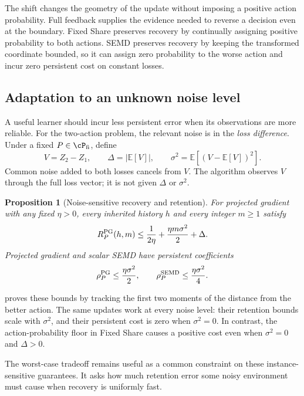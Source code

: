 \documentclass[11pt,twoside]{article}
\newcommand{\E}{\mathbb E}
\newtheorem{proposition}[theorem]{Proposition}
\theoremstyle{definition}
\theoremstyle{remark}
\begin{document}
The shift changes the geometry of the update without imposing a positive
action probability. Full feedback supplies the evidence needed to reverse
a decision even at the boundary. Fixed Share preserves recovery by
continually assigning positive probability to both actions. SEMD preserves
recovery by keeping the transformed coordinate bounded, so it can assign
zero probability to the worse action and incur zero persistent cost on
constant losses.

\subsection{Adaptation to an unknown noise level}
\label{sec:noise-adaptation}

A useful learner should incur less persistent error when its observations
are more reliable. For the two-action problem, the relevant noise is in
the \emph{loss difference}. Under a fixed $P\in\cP_{\rm fi}$, define
\[
 V=Z_2-Z_1,\qquad \Delta=|\E[V]|,\qquad
 \sigma^2=\E[(V-\E[V])^2].
\]
Common noise added to both losses cancels from $V$. The algorithm observes
$V$ through the full loss vector; it is not given $\Delta$ or $\sigma^2$.

\begin{proposition}[Noise-sensitive recovery and retention]
\label{ex:noise-sensitive}
For projected gradient with any fixed $\eta>0$, every inherited history
$h$ and every integer $m\ge1$ satisfy
\begin{equation}
 R_P^{\rm PG}(h,m)
 \le\frac1{2\eta}+\frac{\eta m\sigma^2}{2}+\Delta.
 \label{eq:pg-noise}
\end{equation}
Projected gradient and scalar SEMD have persistent coefficients
\begin{equation}
 \rho_P^{\rm PG}\le\frac{\eta\sigma^2}{2},\qquad
 \rho_P^{\rm SEMD}\le\frac{\eta\sigma^2}{4}.
 \label{eq:noise-retention}
\end{equation}
\end{proposition}

 proves these bounds by tracking the first two
moments of the distance from the better action. The same updates work at
every noise level: their retention bounds scale with $\sigma^2$, and
their persistent cost is zero when $\sigma^2=0$.
In contrast, the action-probability floor in Fixed Share causes a positive
cost even when $\sigma^2=0$ and $\Delta>0$.

The worst-case tradeoff remains useful as a common constraint on these
instance-sensitive guarantees. It asks how much retention error some
noisy environment must cause when recovery is uniformly fast.
\end{document}
